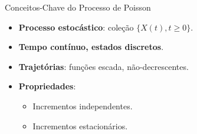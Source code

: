 \documentclass{beamer}
\begin{document}
\begin{frame}{Conceitos-Chave do Processo de Poisson}
\begin{itemize}
  \item<1-> \textbf{Processo estocástico}: coleção $\{X(t), t \geq 0\}$.
  \item<2-> \textbf{Tempo contínuo, estados discretos}.
  \item<3-> \textbf{Trajetórias}: funções escada, não-decrescentes.
  \item<4-> \textbf{Propriedades}:
    \begin{itemize}
      \item<5-> Incrementos independentes.
      \item<6-> Incrementos estacionários.
    \end{itemize}
\end{itemize}
\end{frame}
\end{document}
